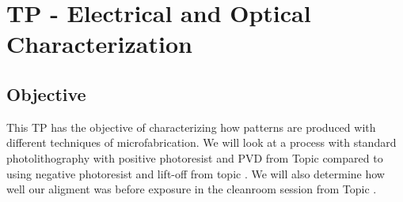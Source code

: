 \section{TP - Electrical and Optical Characterization}
\label{sec:TP}


\subsection{Objective}
This TP has the objective of characterizing how patterns are produced with different techniques of microfabrication. We will look at a process with standard photolithography with positive photoresist and PVD from Topic  compared to using negative photoresist and lift-off from topic . We will also determine how well our aligment was before exposure in the cleanroom session from Topic .


